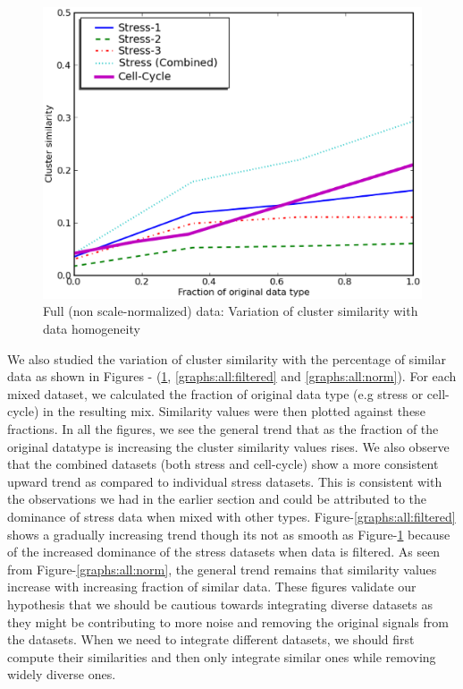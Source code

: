 \begin{figure}[t]\centering
\includegraphics[scale=0.6]{chapter1/plot_unnorm.eps}
\caption{Full (non scale-normalized) data: Variation of cluster similarity with data homogeneity}
\label{graphs:all:unnorm}
\end{figure}

We also studied the variation of cluster similarity with the percentage of similar data as shown in Figures - (\ref{graphs:all:unnorm}, \ref{graphs:all:filtered} and \ref{graphs:all:norm}). For each mixed dataset, we calculated the fraction of original data type (e.g stress or cell-cycle) in the resulting mix. Similarity values were then plotted against these fractions. In all the figures, we see the general trend that as the fraction of the original datatype is increasing the cluster similarity values rises. We also observe that the combined datasets (both stress and cell-cycle) show a more consistent upward trend as compared to individual stress datasets. This is consistent with the observations we had in the earlier section and could be attributed to the dominance of stress data when mixed with other types. Figure-\ref{graphs:all:filtered} shows a gradually increasing trend though its not as smooth as Figure-\ref{graphs:all:unnorm} because of the increased dominance of the stress datasets when data is filtered. As seen from Figure-\ref{graphs:all:norm}, the general trend remains that similarity values increase with increasing fraction of similar data. These figures validate our hypothesis that we should be cautious towards integrating diverse datasets as they might be contributing to more noise and removing the original signals from the datasets. When we need to integrate different datasets, we should first compute their similarities and then only integrate similar ones while removing widely diverse ones.

